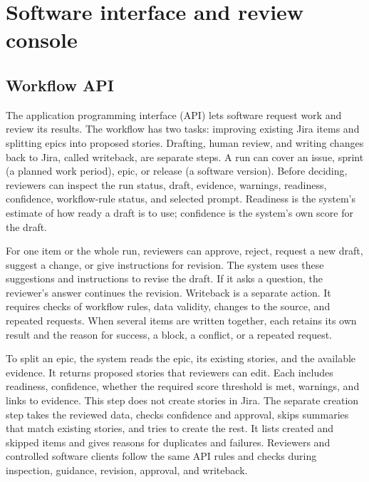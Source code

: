 \documentclass[10pt,a4paper]{article}
\begin{document}
\section{Software interface and review console}\label{sec:workflow-ui}

\subsection{Workflow API}
The application programming interface (API) lets software request work and review its results. The workflow has two tasks: improving existing Jira items and splitting epics into proposed stories. Drafting, human review, and writing changes back to Jira, called writeback, are separate steps. A run can cover an issue, sprint (a planned work period), epic, or release (a software version). Before deciding, reviewers can inspect the run status, draft, evidence, warnings, readiness, confidence, workflow-rule status, and selected prompt. Readiness is the system's estimate of how ready a draft is to use; confidence is the system's own score for the draft.

For one item or the whole run, reviewers can approve, reject, request a new draft, suggest a change, or give instructions for revision. The system uses these suggestions and instructions to revise the draft. If it asks a question, the reviewer's answer continues the revision. Writeback is a separate action. It requires checks of workflow rules, data validity, changes to the source, and repeated requests. When several items are written together, each retains its own result and the reason for success, a block, a conflict, or a repeated request.

To split an epic, the system reads the epic, its existing stories, and the available evidence. It returns proposed stories that reviewers can edit. Each includes readiness, confidence, whether the required score threshold is met, warnings, and links to evidence. This step does not create stories in Jira. The separate creation step takes the reviewed data, checks confidence and approval, skips summaries that match existing stories, and tries to create the rest. It lists created and skipped items and gives reasons for duplicates and failures. Reviewers and controlled software clients follow the same API rules and checks during inspection, guidance, revision, approval, and writeback.
\end{document}
